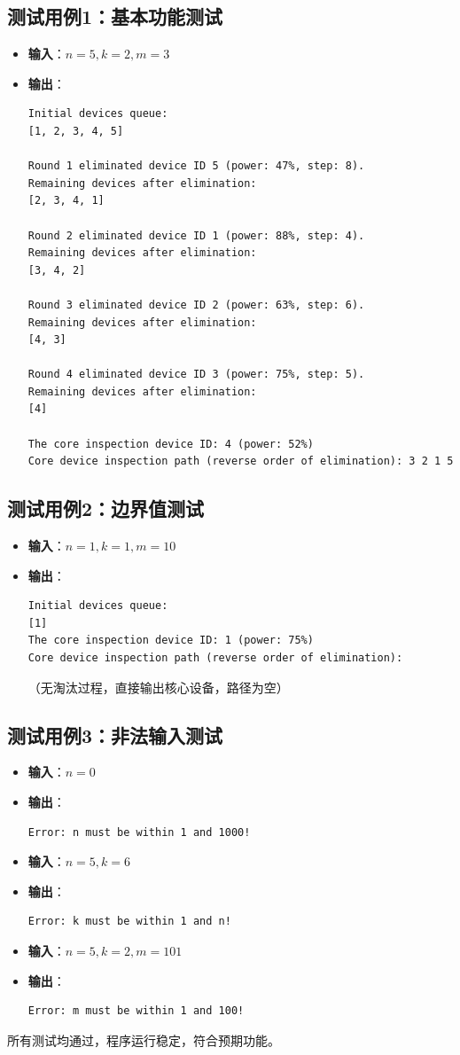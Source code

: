 \documentclass[UTF8]{ctexart}
\begin{document}
\subsection{测试用例1：基本功能测试}
\begin{itemize}
    \item \textbf{输入}：\( n=5, k=2, m=3 \)
    \item \textbf{输出}：
\begin{verbatim}
Initial devices queue:
[1, 2, 3, 4, 5]

Round 1 eliminated device ID 5 (power: 47%, step: 8).
Remaining devices after elimination:
[2, 3, 4, 1]

Round 2 eliminated device ID 1 (power: 88%, step: 4).
Remaining devices after elimination:
[3, 4, 2]

Round 3 eliminated device ID 2 (power: 63%, step: 6).
Remaining devices after elimination:
[4, 3]

Round 4 eliminated device ID 3 (power: 75%, step: 5).
Remaining devices after elimination:
[4]

The core inspection device ID: 4 (power: 52%)
Core device inspection path (reverse order of elimination): 3 2 1 5
\end{verbatim}
\end{itemize}

\subsection{测试用例2：边界值测试}
\begin{itemize}
    \item \textbf{输入}：\( n=1, k=1, m=10 \)
    \item \textbf{输出}：
\begin{verbatim}
Initial devices queue:
[1]
The core inspection device ID: 1 (power: 75%)
Core device inspection path (reverse order of elimination): 
\end{verbatim}
    （无淘汰过程，直接输出核心设备，路径为空）
\end{itemize}

\subsection{测试用例3：非法输入测试}
\begin{itemize}
    \item \textbf{输入}：\( n=0 \)
    \item \textbf{输出}：
\begin{verbatim}
Error: n must be within 1 and 1000!
\end{verbatim}
    \item \textbf{输入}：\( n=5, k=6 \)
    \item \textbf{输出}：
\begin{verbatim}
Error: k must be within 1 and n!
\end{verbatim}
    \item \textbf{输入}：\( n=5, k=2, m=101 \)
    \item \textbf{输出}：
\begin{verbatim}
Error: m must be within 1 and 100!
\end{verbatim}
\end{itemize}

所有测试均通过，程序运行稳定，符合预期功能。
\end{document}
